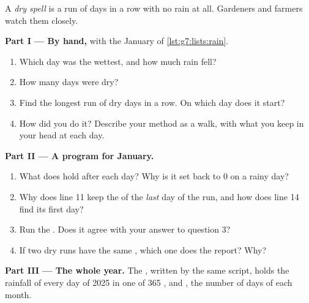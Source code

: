 \begin{problem}\label{pb:g7:lists:1}
A \emph{dry spell} is a run of days in a row with no rain at all. Gardeners and
farmers watch them closely.

\medskip\noindent\textbf{Part I --- By hand,} with the January  of
\cref{lst:g7:lists:rain}.
\begin{enumerate}
  \item Which day was the wettest, and how much rain fell?
  \item How many days were dry?
  \item Find the longest run of dry days in a row. On which day does it start?
  \item How did you do it? Describe your method as a walk, with what you
    keep in your head at each day.
\end{enumerate}

\medskip\noindent\textbf{Part II --- A program for January.}

\label{lst:g7:lists:dry-spell}

\begin{enumerate}[resume]
  \item What does  hold after each day? Why is it set back to 0 on a
    rainy day?
  \item Why does line 11 keep the  of the \emph{last} day of the run, and
    how does line 14 find its first day?
  \item Run the . Does it agree with your answer to question 3?
  \item If two dry runs have the same , which one does the 
    report? Why?
\end{enumerate}

\medskip\noindent\textbf{Part III --- The whole year.} The 
, written by the same script, holds the rainfall of every
day of 2025 in one  of 365 , and , the number of days
of each month.

\label{lst:g7:lists:dry-year}


\end{problem}
